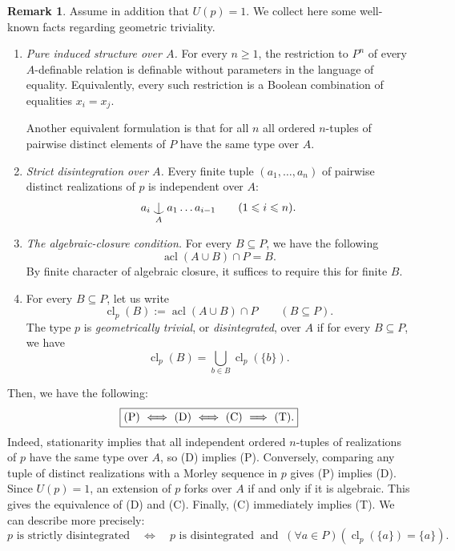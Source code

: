 \documentclass[11pt,a4paper]{amsart}
\theoremstyle{definition}
\newtheorem{remark}[theorem]{Remark}
\def\Ind#1#2{#1\setbox0=\hbox{$#1x$}\kern\wd0\hbox to
  0pt{\hss$#1\mid$\hss} \lower.9\ht0\hbox to
  0pt{\hss$#1\smile$\hss}\kern\wd0}
\def\ind{\mathop{\mathpalette\Ind{}}}
\begin{document}
\begin{remark}\label{PDCT}
Assume in addition that $U(p)=1$. We collect here some well-known facts regarding geometric triviality.
\begin{enumerate}
\item[(P)]
\emph{Pure induced structure over $A$.}
For every $n\geqslant 1$, the restriction to $P^n$ of every $A$-definable
relation is definable without parameters in the language of equality.
Equivalently, every such restriction is a Boolean combination of
equalities $x_i=x_j$.

Another equivalent formulation is that for all $n$ all ordered $n$-tuples of pairwise distinct elements of
$P$ have the same type over $A$.

\item[(D)]
\emph{Strict disintegration over $A$.}
Every finite tuple $(a_1,\ldots,a_n)$ of pairwise distinct realizations of $p$ is
independent over $A$:
\[
a_i\ind_A a_1\ldots a_{i-1}
\qquad (1\leqslant i\leqslant n).
\]

\item[(C)]
\emph{The algebraic-closure condition.} For every $B\subseteq P$, we have the following
\[
\operatorname{acl}(A\cup B)\cap P=B.
\]
By finite character of algebraic closure, it suffices to require this
for finite $B$.

\item[(T)] For every $B\subseteq P$, let us write
\[
\operatorname{cl}_p(B):=\operatorname{acl}(A\cup B)\cap P
\qquad(B\subseteq P).
\]
The type $p$ is \emph{geometrically trivial}, or \emph{disintegrated},
over $A$ if for every $B\subseteq P$, we have
\[
\operatorname{cl}_p(B)
=
\bigcup_{b\in B}\operatorname{cl}_p(\{b\}).
\]
\end{enumerate}
Then, we have the following:
\[
\boxed{\textnormal{(P)}
\ \Longleftrightarrow\
\textnormal{(D)}
\ \Longleftrightarrow\
\textnormal{(C)}\ \Longrightarrow\
\textnormal{(T)}.}
\]
Indeed, stationarity implies that all independent ordered
$n$-tuples of realizations of $p$ have the same type over $A$,
so \textnormal{(D)} implies \textnormal{(P)}. Conversely,
comparing any tuple of distinct realizations with a Morley
sequence in $p$ gives \textnormal{(P)} implies
\textnormal{(D)}. Since $U(p)=1$, an extension of $p$ forks
over $A$ if and only if it is algebraic. This gives the
equivalence of \textnormal{(D)} and \textnormal{(C)}.
Finally, \textnormal{(C)} immediately implies
\textnormal{(T)}.
We can describe more precisely:
\[
p\text{ is strictly disintegrated}
\quad\Longleftrightarrow\quad
p\text{ is disintegrated $\ $and $\ \left(\forall a\in P\right)\left(\operatorname{cl}_p(\{a\})=\{a\}\right)$}
.
\]
\end{remark}
\end{document}
